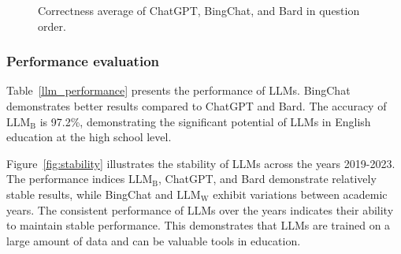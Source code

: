 \documentclass[11pt]{article}
\begin{document}
\begin{figure*}[h!]
\begin{center}
{
		}
	\end{center}
	\caption{Correctness average of ChatGPT, BingChat, and Bard in question order.}
	\label{fig:question_order}
\end{figure*}

\subsubsection{Performance evaluation}

Table~\ref{llm_performance} presents the performance of LLMs. BingChat demonstrates better results compared to ChatGPT and Bard. The accuracy of $\mathrm{LLM_{B}}$ is 97.2\%, demonstrating the significant potential of LLMs in English education at the high school level. 

Figure~\ref{fig:stability} illustrates the stability of LLMs across the years 2019-2023. The performance indices $\mathrm{LLM_{B}}$, ChatGPT, and Bard demonstrate relatively stable results, while BingChat and $\mathrm{LLM_{W}}$ exhibit variations between academic years. The consistent performance of LLMs over the years indicates their ability to maintain stable performance. This demonstrates that LLMs are trained on a large amount of data and can be valuable tools in education. 
\end{document}
